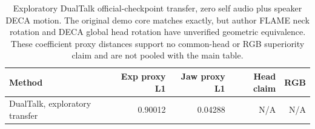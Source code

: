 \begin{table}[H]
\centering\small
\caption{Exploratory DualTalk official-checkpoint transfer, zero self audio plus speaker DECA motion. The original demo core matches exactly, but author FLAME neck rotation and DECA global head rotation have unverified geometric equivalence. These coefficient proxy distances support no common-head or RGB superiority claim and are not pooled with the main table.}
\label{tab:dualtalk-proxy}
\setlength{\tabcolsep}{4pt}
\begin{tabular}{lrrrr}
\toprule
Method & Exp proxy L1 & Jaw proxy L1 & Head claim & RGB \\
\midrule
DualTalk, exploratory transfer & 0.90012 & 0.04288 & N/A & N/A \\
\bottomrule
\end{tabular}
\end{table}
